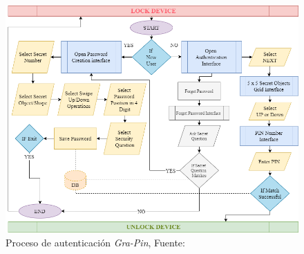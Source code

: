 \begin{anexos}
\begin{figure}[H]
	\centering
	\includegraphics[width=1\linewidth]{grapin-proceso.png}
	\caption{Proceso de autenticación \textit{Gra-Pin}, Fuente: \cite{kausar2022gra} }
	\label{gra-pin}
\end{figure}



\end{anexos}
